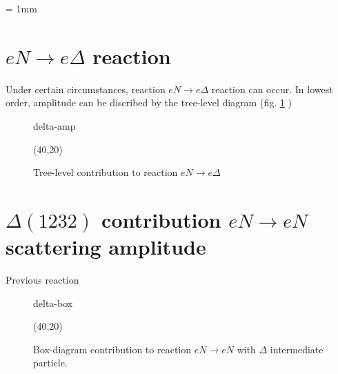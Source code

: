 \documentclass{article}
\begin{document}
	\unitlength = 1mm
\section{ $eN \to e\Delta$ reaction}
	Under certain circumstances, reaction $eN \to e\Delta$ reaction
	can occur. In lowest order, amplitude can be discribed by the
	tree-level diagram (fig. \ref{fig:delta-amp} )
	\begin{figure} \centering \label{fig:delta-amp}
	\begin{fmffile}{delta-amp}
		\begin{fmfgraph*}(40,20)
		\end{fmfgraph*}
	\end{fmffile}
	\caption{Tree-level contribution to reaction $eN \to e\Delta$}
	\end{figure}
	
	
\section{$\Delta(1232)$ contribution $e N \to e N$ scattering amplitude}
	Previous reaction
	\begin{figure} \centering
	\begin{fmffile}{delta-box}
		\begin{fmfgraph*}(40,20)
		\end{fmfgraph*}
	\end{fmffile}
	\caption{Box-diagram contribution to reaction $eN \to eN$ with %
		$\Delta$ intermediate particle.}
	\end{figure}
	
\end{document}

